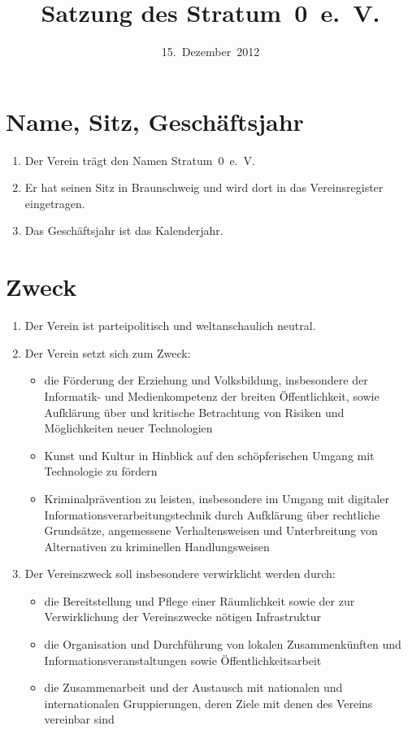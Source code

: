 \documentclass[a4paper,12pt]{scrartcl}
\title{Satzung des Stratum~0~e.~V.}
\date{15.~Dezember~2012}
\begin{document}
\maketitle

\section{Name, Sitz, Geschäftsjahr}
\begin{enumerate}
  \item Der Verein trägt den Namen Stratum~0~e.~V.
  \item Er hat seinen Sitz in Braunschweig und wird dort in das Vereinsregister
    eingetragen.
  \item Das Geschäftsjahr ist das Kalenderjahr.
\end{enumerate}

\section{Zweck}
\begin{enumerate}
  \item Der Verein ist parteipolitisch und weltanschaulich neutral.
  \item Der Verein setzt sich zum Zweck:
    \begin{itemize}
      \item
         die Förderung der Erziehung und Volksbildung, insbesondere der
         Informatik- und Medienkompetenz der breiten Öffentlichkeit, sowie
         Aufklärung über und kritische Betrachtung von Risiken und
         Möglichkeiten neuer Technologien
      \item Kunst und Kultur in Hinblick auf den schöpferischen Umgang mit
        Technologie zu fördern
      \item Kriminalprävention zu leisten, insbesondere im Umgang mit digitaler
        Informationsverarbeitungstechnik durch Aufklärung über rechtliche
        Grundsätze, angemessene Verhaltensweisen und Unterbreitung von
        Alternativen zu kriminellen Handlungsweisen
    \end{itemize}
  \item Der Vereinszweck soll insbesondere verwirklicht werden durch:
    \begin{itemize}
      \item die Bereitstellung und Pflege einer Räumlichkeit sowie der zur
        Verwirklichung der Vereinszwecke nötigen Infrastruktur
      \item die Organisation und Durchführung von lokalen Zusammenkünften und
        Informationsveranstaltungen sowie Öffentlichkeitsarbeit
      \item die Zusammenarbeit und der Austausch mit nationalen und
        internationalen Gruppierungen, deren Ziele mit denen des Vereins
        vereinbar sind
    \end{itemize}
\end{enumerate}
\end{document}
